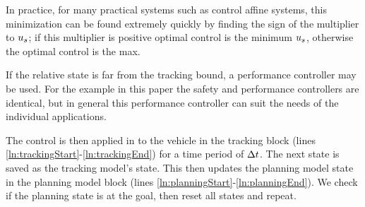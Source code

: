 In practice, for many practical systems such as control affine systems, this minimization can be found extremely quickly by finding the sign of the multiplier to $u_s$; if this multiplier is positive optimal control is the minimum $u_s$, otherwise the optimal control is the max.

If the relative state is far from the tracking bound, a performance controller may be used. For the example in this paper the safety and performance controllers are identical, but in general this performance controller can suit the needs of the individual applications.

The control is then applied in to the vehicle in the tracking block (lines \ref{ln:trackingStart}-\ref{ln:trackingEnd}) for a time period of $\Delta t$. The next state is saved as the tracking model's state. This then updates the planning model state in the planning model block (lines \ref{ln:planningStart}-\ref{ln:planningEnd}). We check if the planning state is at the goal, then reset all states and repeat.

